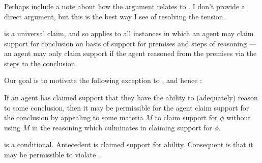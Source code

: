 \subsubsection{\EAS{}}
\label{sec:eas}

{
  \color{red}
  Perhaps include a note about how the argument relates to \EAS{}.
  I don't provide a direct argument, but this is the best way I see of resolving the tension.
}

\begin{note}[Alternative]
  \ESU{} is a universal claim, and so applies to all instances in which an agent may claim support for conclusion on basis of support for premises and steps of reasoning --- an agent may only claim support if the agent reasoned from the premises via the steps to the conclusion.

  Our goal is to motivate the following exception to \gESU{}, and hence \ESU{}:

  \begin{proposition}[\EAS{-} --- \EAS{}]\label{prop:EAS}
    If an agent has claimed support that they have the ability to (adequately) reason to some conclusion, then it may be permissible for the agent claim support for the conclusion by appealing to some materia \(M\) to claim support for \(\phi\) without using \(M\) in the reasoning which culminates in claiming support for \(\phi\).
  \end{proposition}
\end{note}

\begin{note}
  \EAS{} is a conditional.
  Antecedent is claimed support for ability.
  Consequent is that it may be permissible to violate \gESU{}.
\end{note}

